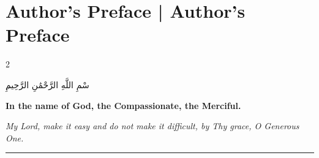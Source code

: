 \documentclass[11pt,a4paper]{article}
\newcommand{\longline}{\noindent\rule{\textwidth}{0.4pt}}
\newcommand{\arlarge}[1]{{\Large\arabicfont\RL{#1}}}
\begin{document}
\section*{Author's Preface | Author's Preface}

\begin{paracol}{2}

\switchcolumn[0]
\begin{center}
{\arlarge بِسْمِ اللَّهِ الرَّحْمَٰنِ الرَّحِيمِ}
\end{center}

\smallskip

\begin{flushright}
{\small\arabicfont{}}
\end{flushright}

\switchcolumn[1]
\begin{center}
\textbf{In the name of God, the Compassionate, the Merciful.}
\end{center}

\smallskip

\textit{My Lord, make it easy and do not make it difficult, by Thy grace, O Generous One.}

\end{paracol}

\vspace{0.3cm}
\longline
\vspace{0.3cm}
\end{document}
